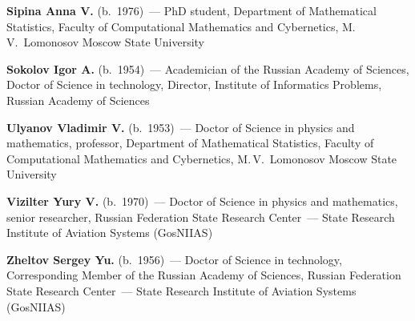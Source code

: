 \begin{multicols}{2}

\noindent
\textbf{Sipina Anna V.} (b.\ 1976)~--- PhD student, Department of Mathematical Statistics, 
Faculty of Computational Mathematics and Cybernetics, M.\,V.~Lomonosov Moscow State University






\noindent
\textbf{Sokolov Igor A.} (b.\ 1954)~--- Academician of the Russian Academy of Sciences,
Doctor of Science in technology, Director,
Institute of Informatics Problems,  Russian Academy of Sciences


\noindent
\textbf{Ulyanov Vladimir V.} (b.\ 1953)~--- Doctor of Science in physics and mathematics, professor,
Department of Mathematical Statistics, 
Faculty of Computational Mathematics and Cybernetics, M.\,V.~Lomonosov Moscow State University


\noindent
\textbf{Vizilter Yury V.} (b.\ 1970)~--- Doctor of Science in physics and mathematics,
senior researcher, Russian Federation State Research Center~--- State Research
Institute of Aviation Systems (GosNIIAS)


\noindent
\textbf{Zheltov Sergey Yu.} (b.\ 1956)~--- Doctor of Science in technology, Corresponding Member of 
the Russian Academy of Sciences,
Russian Federation State Research Center~--- State Research
Institute of Aviation Systems (GosNIIAS)




\end{multicols}